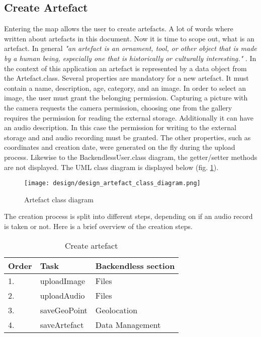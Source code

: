 \subsection{Create Artefact}
Entering the map allows the user to create artefacts. A lot of words where written about artefacts in this document. Now it is time to scope out, what is an artefact. In general \textit{"an artefact is an ornament, tool, or other object that is made by a human being, especially one that is historically or culturally interesting."} \cite{artefact}. In the context of this application an artefact is represented by a data object from the Artefact.class. Several properties are mandatory for a new artefact. It must contain a name, description, age, category, and an image. In order to select an image, the user must grant the belonging permission. Capturing a picture with the camera requests the camera permission, choosing one from the gallery requires the permission for reading the external storage. Additionally it can have an audio description. In this case the permission for writing to the external storage and and audio recording must be granted. 
The other properties, such as coordinates and creation date, were generated on the fly during the upload process. Likewise to the BackendlessUser.class diagram, the getter/setter methods are not displayed. The UML class diagram is displayed below (fig. \ref{fig:design_artefact_class_diagram}).

\begin{figure}[H]
	\centering \texttt{[image: design/design\_artefact\_class\_diagram.png]}
	\caption{Artefact class diagram}	
	\label{fig:design_artefact_class_diagram}
\end{figure}

The creation process is split into different steps, depending on if an audio record is taken or not. Here is a brief overview of the creation steps. 

\begin{table}[h]
\centering
\begin{tabular}{|l|l|l|}
\hline
\textbf{Order} & \textbf{Task} & \textbf{Backendless section} \\ \hline
1.             & uploadImage   & Files                        \\ \hline
2.             & uploadAudio   & Files                        \\ \hline
3.             & saveGeoPoint  & Geolocation                  \\ \hline
4.             & saveArtefact  & Data Management              \\ \hline
\end{tabular}
\caption{Create artefact}
\label{table:create_artefact}
\end{table}

